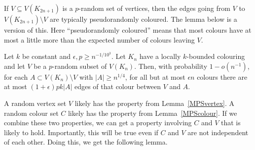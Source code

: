If $V\subseteq V(K_{2n+1})$ is a $p$-random set of vertices, then the edges going from $V$ to $V(K_{2n+1})\setminus V$ are typically pseudorandomly coloured. The lemma below is a version of this. Here ``pseudorandomly coloured'' means that most colours have at most a little more than the expected number of colours leaving $V$.
\begin{lemma}\label{MPSvertex}\label{Corollary_MPS_randsetcor}
Let $k$ be constant and  $\epsilon,p\geq n^{-1/10^3}$. Let $K_n$ have a {locally}  $k$-bounded colouring and let $V$ be a $p$-random subset of $V(K_n)$. Then, with  probability $1-o(n^{-1})$, for each $A\subset V(K_n)\setminus V$  with $|A|\geq n^{1/4}$, for all but at most $\epsilon n$ colours there are at most $(1+\epsilon)pk|A|$ edges of that colour between $V$ and $A$.
\end{lemma}
 


 

A random vertex set $V$ likely has the property from Lemma~\ref{MPSvertex}. A random colour set $C$ likely has the property from Lemma~\ref{MPScolour}. If we combine these two properties, we can get a property involving $C$ and $V$ that is likely to hold. Importantly, this will be true even if $C$ and $V$ are not independent of each other. Doing this, we get the following lemma.

